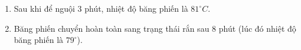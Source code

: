 \begin{bt}
{\begin{enumerate}
			Từ bảng giá trị của hàm số, ta có tập xác định $\mathscr{D}=\{0 ; 1 ; 2 ; 3 ; 4 ; 5 ; 6 ; 7 ; 8 ; 9 ; 10\}$ và tập giá trị $T=\{75 ; 77 ; 79 ; 80 ; 81 ; 82 ; 84 ; 86\}$.
			\item Sau khi để nguội $3$ phút, nhiệt độ băng phiến là $81^{\circ}C$.
			\item Băng phiến chuyển hoàn toàn sang trạng thái rắn sau $8$ phút (lúc đó nhiệt độ băng phiến là $79^{\circ}$).
		\end{enumerate}
	}
\end{bt}
